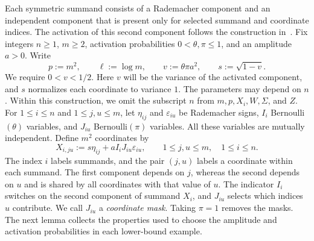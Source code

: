 \documentclass[11pt,letterpaper]{article}
\newenvironment{recovered}{\color{magenta}}{}
\theoremstyle{remark}
\begin{document}
\begin{recovered}
Each symmetric summand consists of a Rademacher component and an
independent component that is present only for selected summand and
coordinate indices. The activation of this second component follows
the construction in~\cite[Proposition~E.1]{FKLZ}.
\end{recovered}
Fix integers \(n\ge1\), \(m\ge2\), activation probabilities
\(0<\theta,\pi\le1\), and an amplitude \(a>0\). Write
\[
 p:=m^2,\qquad \ell:=\log m,\qquad
 v:=\theta\pi a^2,\qquad s:=\sqrt{1-v}.
\]
We require \(0<v<1/2\). Here \(v\) will be the variance of the
activated component, and \(s\) normalizes each coordinate to variance
\(1\). The parameters may depend on \(n\). Within this construction,
we omit the subscript \(n\) from \(m,p,X_i,W,\Sigma\), and \(Z\).
\begin{recovered}
For \(1\le i\le n\) and \(1\le j,u\le m\), let \(\eta_{ij}\) and
\(\varepsilon_{iu}\) be Rademacher signs, \(I_i\) Bernoulli\((\theta)\)
variables, and \(J_{iu}\) Bernoulli\((\pi)\) variables. All these
variables are mutually independent.
\end{recovered} Define \(m^2\) coordinates by
\begin{equation}
 X_{i,ju}:=s\eta_{ij}+aI_iJ_{iu}\varepsilon_{iu},
 \qquad 1\le j,u\le m,\quad 1\le i\le n.
 \label{sym:eq:common-construction}
\end{equation}
\begin{recovered}
The index \(i\) labels summands, and the pair \((j,u)\) labels a
coordinate within each summand. The first component depends on \(j\),
whereas the second depends on \(u\) and is shared by all coordinates
with that value of \(u\). The indicator \(I_i\) switches on the second
component of summand \(X_i\), and \(J_{iu}\) selects which indices
\(u\) contribute. We call \(J_{iu}\) a \emph{coordinate mask}.
Taking \(\pi=1\) removes the masks.
\end{recovered}
\begin{recovered}
The next lemma collects the properties used to choose the amplitude
and activation probabilities in each lower-bound example.
\end{recovered}
\end{document}
